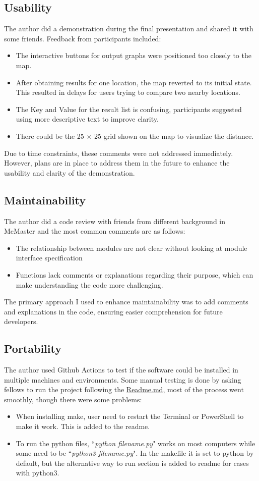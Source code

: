 \documentclass[12pt, titlepage]{article}
\begin{document}
\subsection{Usability}
The author did a demonstration during the final presentation and shared it with some friends. Feedback from participants included:
\begin{itemize}
\item The interactive buttons for output graphs were positioned too closely to the map.
\item After obtaining results for one location, the map reverted to its initial state. This resulted in delays for users trying to compare two nearby locations.
\item The Key and Value for the result list is confusing, participants suggested using more descriptive text to improve clarity.
\item There could be the 25 $\times$ 25 grid shown on the map to visualize the distance.
\end{itemize}
Due to time constraints, these comments were not addressed immediately. However, plans are in place to address them in the future to enhance the usability and clarity of the demonstration.

\subsection{Maintainability}
The author did a code review with friends from different background in McMaster and the most common comments are as follows:
\begin{itemize}
\item The relationship between modules are not clear without looking at module interface specification
\item Functions lack comments or explanations regarding their purpose, which can make understanding the code more challenging.
\end{itemize}
The primary approach I used to enhance maintainability was to add comments and explanations in the code, ensuring easier comprehension for future developers.


\subsection{Portability}
The author used Github Actions to test if the software could be installed in multiple machines and environments. Some manual testing is done by asking fellows to run the project following the \href{https://github.com/smiths/BridgeChlorideExposurePredictor/blob/main/README.md}{Readme.md}, most of the process went smoothly, though there were some problems:
\begin{itemize}
\item When installing make, user need to restart the Terminal or PowerShell to make it work. This is added to the readme.
\item To run the python files, ``\textit{python filename.py}" works on most computers while some need to be ``\textit{python3 filename.py}". In the makefile it is set to python by default, but the alternative way to run section is added to readme for cases with python3.
\end{itemize}
\end{document}
